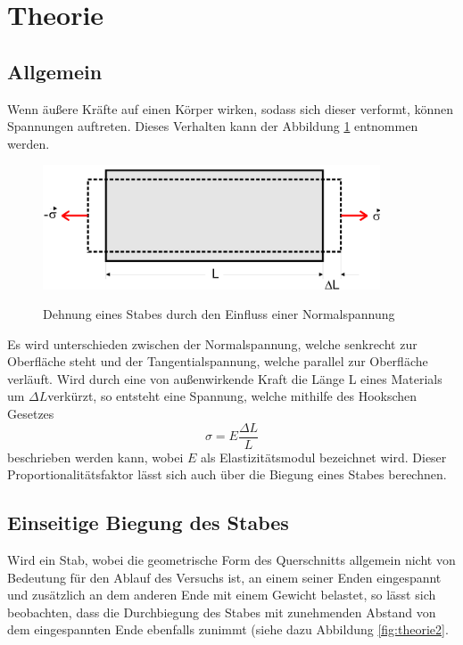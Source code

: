 \section{Theorie}
\label{sec:Theorie}

\subsection{Allgemein}

Wenn äußere Kräfte auf einen Körper wirken, sodass 
sich dieser verformt, können Spannungen auftreten.
Dieses Verhalten kann der Abbildung \ref{fig:theorie1}
entnommen werden.

\begin{figure}[h]
    \centering
    \includegraphics[width=10cm]{Theorie1.png}
    \label{fig:theorie1}
    \caption{Dehnung eines Stabes durch den Einfluss einer Normalspannung}
\end{figure}
\noindent
Es wird unterschieden zwischen der Normalspannung,
welche senkrecht zur Oberfläche steht und der 
Tangentialspannung, welche parallel zur Oberfläche 
verläuft. Wird durch eine von außenwirkende Kraft 
die Länge L eines Materials um $\Delta L $verkürzt, 
so entsteht eine Spannung, welche mithilfe
des Hookschen Gesetzes
\begin{equation}
    \sigma = E \frac{\Delta L}{L}
    \label{eq:1}
\end{equation}
\noindent beschrieben werden kann, wobei $E$ als
Elastizitätsmodul bezeichnet wird. Dieser 
Proportionalitätsfaktor lässt sich auch über die 
Biegung eines Stabes berechnen.


\subsection{Einseitige Biegung des Stabes}

Wird ein Stab, wobei die geometrische Form des 
Querschnitts allgemein nicht von Bedeutung für den
Ablauf des Versuchs ist, an einem seiner Enden
eingespannt und zusätzlich an dem anderen Ende mit 
einem Gewicht belastet, so lässt sich beobachten,
dass die Durchbiegung des Stabes mit zunehmenden
Abstand von dem eingespannten Ende ebenfalls 
zunimmt (siehe dazu Abbildung \ref{fig:theorie2}.

